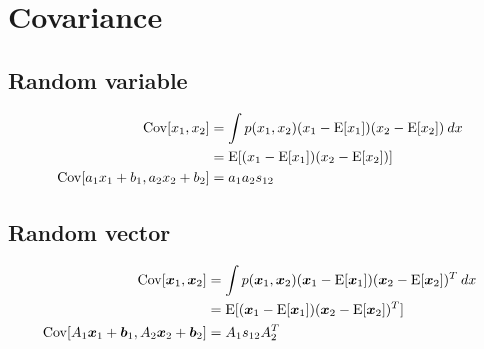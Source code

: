 \documentclass[a4paper]{article}
\begin{document}
\section{Covariance}
\subsection{Random variable}
\begin{align*}
  \operatorname{Cov}[x_1, x_2] &= \int p(x_1, x_2) (x_1-\operatorname{E}[x_1]) (x_2-\operatorname{E}[x_2]) \: dx \\
                 &= \operatorname{E}[(x_1-\operatorname{E}[x_1])(x_2-\operatorname{E}[x_2])] \\
  \operatorname{Cov}[a_1 x_1 + b_1, a_2 x_2 + b_2] &= a_1 a_2 s_{12} \\
\end{align*}

\subsection{Random vector}
\begin{align*}
  \operatorname{Cov}[\boldsymbol{x}_1, \boldsymbol{x}_2] &= \int p(\boldsymbol{x}_1, \boldsymbol{x}_2) (\boldsymbol{x}_1-\operatorname{E}[\boldsymbol{x}_1]) (\boldsymbol{x}_2-\operatorname{E}[\boldsymbol{x}_2])^T \: dx \\
                           &= \operatorname{E}[(\boldsymbol{x}_1-\operatorname{E}[\boldsymbol{x}_1])(\boldsymbol{x}_2-\operatorname{E}[\boldsymbol{x}_2])^T] \\
  \operatorname{Cov}[A_1 \boldsymbol{x}_1 + \boldsymbol{b}_1, A_2 \boldsymbol{x}_2 + \boldsymbol{b}_2] &= A_1 s_{12} A_2^T \\
\end{align*}
\end{document}
